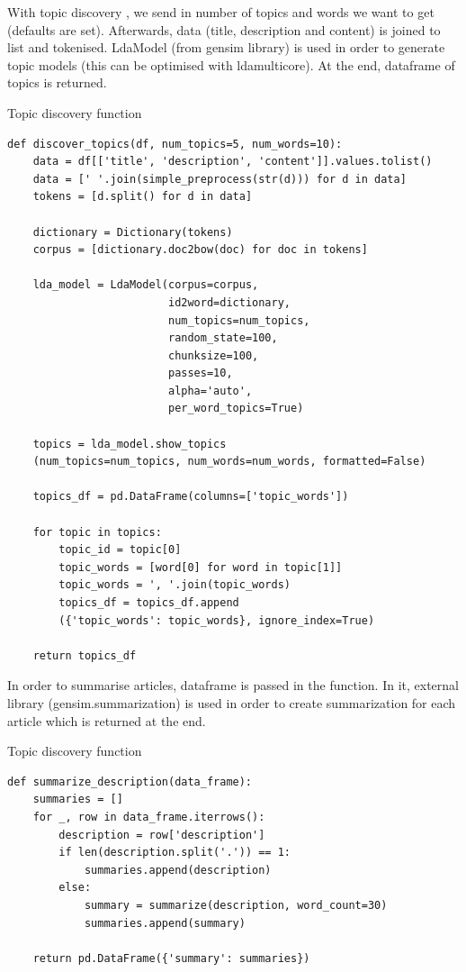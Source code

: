 With topic discovery \parencite{pons2007topic}, we send in number of topics and words we want to get (defaults are set). Afterwards, data (title, description and content) is joined to list and tokenised. LdaModel (from gensim library) is used in order to generate topic models (this can be optimised with ldamulticore). At the end, dataframe of topics is returned.
\begin{listing}[H]
\caption{Topic discovery function}
\begin{verbatim}
def discover_topics(df, num_topics=5, num_words=10):
    data = df[['title', 'description', 'content']].values.tolist()
    data = [' '.join(simple_preprocess(str(d))) for d in data]
    tokens = [d.split() for d in data]

    dictionary = Dictionary(tokens)
    corpus = [dictionary.doc2bow(doc) for doc in tokens]

    lda_model = LdaModel(corpus=corpus,
                         id2word=dictionary,
                         num_topics=num_topics,
                         random_state=100,
                         chunksize=100,
                         passes=10,
                         alpha='auto',
                         per_word_topics=True)

    topics = lda_model.show_topics
    (num_topics=num_topics, num_words=num_words, formatted=False)

    topics_df = pd.DataFrame(columns=['topic_words'])

    for topic in topics:
        topic_id = topic[0]
        topic_words = [word[0] for word in topic[1]]
        topic_words = ', '.join(topic_words)
        topics_df = topics_df.append
        ({'topic_words': topic_words}, ignore_index=True)

    return topics_df
\end{verbatim}
\end{listing}

In order to summarise articles, dataframe is passed in the function. In it, external library (gensim.summarization) \parencite{web:Gensim} is used in order to create summarization for each article which is returned at the end.
\begin{listing}[H]
\caption{Topic discovery function}
\begin{verbatim}
def summarize_description(data_frame):
    summaries = []
    for _, row in data_frame.iterrows():
        description = row['description']
        if len(description.split('.')) == 1:
            summaries.append(description)
        else:
            summary = summarize(description, word_count=30)
            summaries.append(summary)
            
    return pd.DataFrame({'summary': summaries})
\end{verbatim}
\end{listing}

